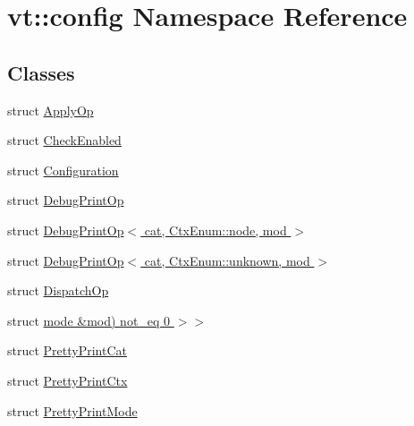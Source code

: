 \hypertarget{namespacevt_1_1config}{}\section{vt\+:\+:config Namespace Reference}
\label{namespacevt_1_1config}
\subsection*{Classes}
\begin{DoxyCompactItemize}
\item 
struct \hyperlink{structvt_1_1config_1_1_apply_op}{Apply\+Op}
\item 
struct \hyperlink{structvt_1_1config_1_1_check_enabled}{Check\+Enabled}
\item 
struct \hyperlink{structvt_1_1config_1_1_configuration}{Configuration}
\item 
struct \hyperlink{structvt_1_1config_1_1_debug_print_op}{Debug\+Print\+Op}
\item 
struct \hyperlink{structvt_1_1config_1_1_debug_print_op_3_01cat_00_01_ctx_enum_1_1node_00_01mod_01_4}{Debug\+Print\+Op$<$ cat, Ctx\+Enum\+::node, mod $>$}
\item 
struct \hyperlink{structvt_1_1config_1_1_debug_print_op_3_01cat_00_01_ctx_enum_1_1unknown_00_01mod_01_4}{Debug\+Print\+Op$<$ cat, Ctx\+Enum\+::unknown, mod $>$}
\item 
struct \hyperlink{structvt_1_1config_1_1_dispatch_op}{Dispatch\+Op}
\item 
struct \hyperlink{structvt_1_1config_1_1_check_enabled_3_01_op_00_01_c_00_01cat_00_01ctx_00_01mod_00_01typename_01b5559c30be7945adbd887e9215f6d30d}{mode \&mod) not\+\_\+eq 0 $>$$>$}
\item 
struct \hyperlink{structvt_1_1config_1_1_pretty_print_cat}{Pretty\+Print\+Cat}
\item 
struct \hyperlink{structvt_1_1config_1_1_pretty_print_ctx}{Pretty\+Print\+Ctx}
\item 
struct \hyperlink{structvt_1_1config_1_1_pretty_print_mode}{Pretty\+Print\+Mode}
\end{DoxyCompactItemize}

